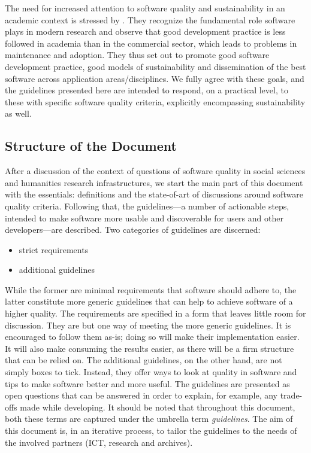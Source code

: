 \documentclass[a4paper,11pt]{article}
\begin{document}
The need for increased attention to software quality and sustainability in an
academic context is stressed by
\cite{RESEARCHSOFTWARE}.
They recognize the fundamental role software plays in modern research and
observe that good development practice is less followed in academia than in the
commercial sector, which leads to problems in maintenance and adoption. They
thus set out to promote good software development practice, good models of
sustainability and dissemination of the best software across application
areas/disciplines. We fully agree with these goals, and the guidelines
presented here are intended to respond, on a practical level, to these with
specific software quality criteria, explicitly encompassing sustainability as
well.

\subsection{Structure of the Document}\label{sec:struc}

After a discussion of the context of questions of software quality in social
sciences and humanities research infrastructures, we start the main part of
this document with the essentials: definitions and the state-of-art of
discussions around software quality criteria.  Following that, the
guidelines---a number of actionable steps, intended to make software more
usable and discoverable for users and other developers---are described. Two
categories of guidelines are discerned: 

\begin{itemize}
	\item strict requirements
	\item additional guidelines %
\end{itemize}

While the former are minimal requirements that software should adhere to, the
latter constitute more generic guidelines that can help to achieve software of
a higher quality.  The requirements are specified in a form that leaves little
room for discussion. They are but one way of meeting the more generic
guidelines. It is encouraged to follow them as-is; doing so will make their
implementation easier. It will also make consuming the results easier, as there
will be a firm structure that can be relied on.  The additional guidelines, on
the other hand, are not simply boxes to tick. Instead, they offer ways to look
at quality in software and tips to make software better and more useful. The
guidelines are presented as open questions that can be answered in order to
explain, for example, any trade-offs made while developing.  It should be noted
that throughout this document, both these terms are captured under the umbrella
term \textit{guidelines}. 
The aim of this document %
is, in an iterative
process, to tailor the guidelines to the needs of the involved partners (ICT, research and archives). 
\end{document}
